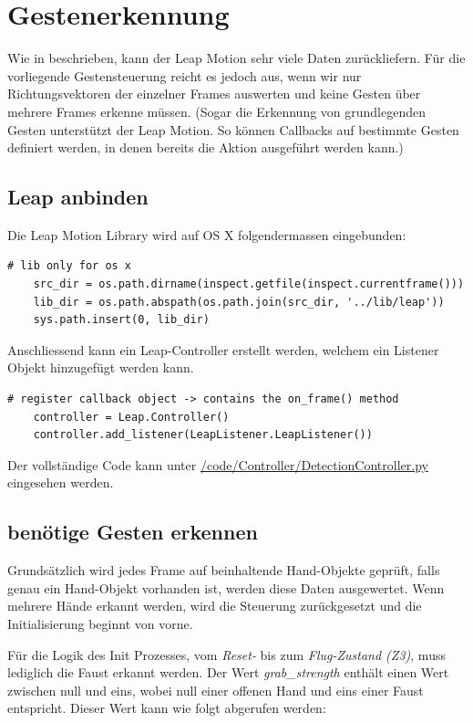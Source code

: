 \section{Gestenerkennung}
Wie in  beschrieben, kann der Leap Motion sehr viele Daten zurückliefern.
Für die vorliegende Gestensteuerung reicht es jedoch aus, wenn wir nur Richtungsvektoren der einzelner Frames auswerten und keine Gesten über mehrere Frames erkenne müssen.
(Sogar die Erkennung von grundlegenden Gesten unterstützt der Leap Motion. So können Callbacks auf bestimmte Gesten definiert werden, in denen bereits die Aktion ausgeführt werden kann.)

\subsection{Leap anbinden}
Die Leap Motion Library wird auf OS X folgendermassen eingebunden:
\begin{lstlisting}[style=lstStyleCpp]
	# lib only for os x
	src_dir = os.path.dirname(inspect.getfile(inspect.currentframe()))
	lib_dir = os.path.abspath(os.path.join(src_dir, '../lib/leap'))
	sys.path.insert(0, lib_dir)
\end{lstlisting}

Anschliessend kann ein Leap-Controller erstellt werden, welchem ein Listener Objekt hinzugefügt werden kann.
\begin{lstlisting}[style=lstStyleCpp]
	# register callback object -> contains the on_frame() method
	controller = Leap.Controller()
	controller.add_listener(LeapListener.LeapListener())
\end{lstlisting}

Der vollständige Code kann unter \href{https://github.com/MrJack91/droneGestures/blob/master/code/Controller/DetectionController.py}{/code/Controller/DetectionController.py} eingesehen werden.

\subsection{benötige Gesten erkennen}
Grundsätzlich wird jedes Frame auf beinhaltende Hand-Objekte geprüft, falls genau ein Hand-Objekt vorhanden ist, werden diese Daten ausgewertet. Wenn mehrere Hände erkannt werden, wird die Steuerung zurückgesetzt und die Initialisierung beginnt von vorne.

Für die Logik des Init Prozesses, vom \textit{Reset-} bis zum \textit{Flug-Zustand (Z3)}, muss lediglich die Faust erkannt werden.
Der Wert \textit{grab\_strength} enthält einen Wert zwischen null und eins, wobei null einer offenen Hand und eins einer Faust entspricht.
Dieser Wert kann wie folgt abgerufen werden:

